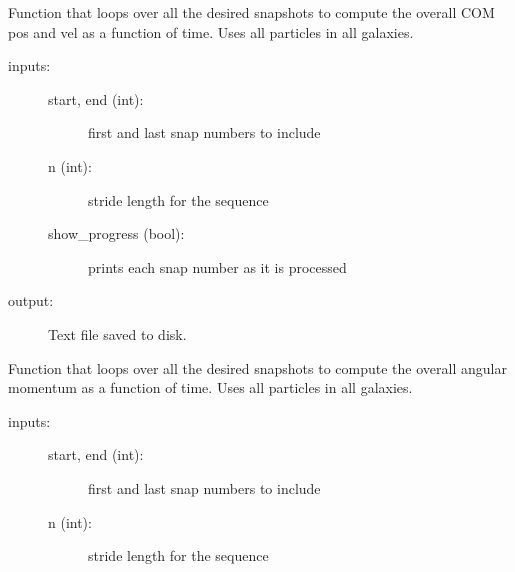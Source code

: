 \documentclass[letterpaper,10pt,english]{sphinxmanual}
\begin{document}
\begin{fulllineitems}
\begin{fulllineitems}
\label{\detokenize{timecourse:galaxy.timecourse.TimeCourse.write_total_com}}
Function that loops over all the desired snapshots to compute the overall COM 
pos and vel as a function of time. Uses all particles in all galaxies.
\begin{description}
\item[{inputs:}] \leavevmode\begin{description}
\item[{start, end (int):}] \leavevmode
first and last snap numbers to include

\item[{n (int):}] \leavevmode
stride length for the sequence

\item[{show\_progress (bool):}] \leavevmode
prints each snap number as it is processed

\end{description}

\item[{output: }] \leavevmode
Text file saved to disk.

\end{description}

\end{fulllineitems}


\begin{fulllineitems}
\label{\detokenize{timecourse:galaxy.timecourse.TimeCourse.write_total_angmom}}
Function that loops over all the desired snapshots to compute the overall 
angular momentum as a function of time. Uses all particles in all galaxies.
\begin{description}
\item[{inputs:}] \leavevmode\begin{description}
\item[{start, end (int):}] \leavevmode
first and last snap numbers to include

\item[{n (int):}] \leavevmode
stride length for the sequence


\end{description}
\end{description}
\end{fulllineitems}
\end{fulllineitems}
\end{document}
